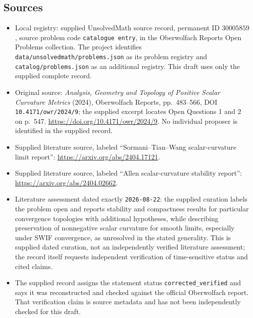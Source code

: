 \documentclass[11pt]{article}
\begin{document}
\subsection{Sources}
\begin{itemize}
\item Local registry: supplied UnsolvedMath source record, permanent ID \(30005859\), source problem code \texttt{catalogue entry}, in the Oberwolfach Reports Open Problems collection. The project identifies \texttt{data/unsolvedmath/problems.json} as its problem registry and \texttt{catalog/problems.json} as an additional registry. This draft uses only the supplied complete record.
\item Original source: \emph{Analysis, Geometry and Topology of Positive Scalar Curvature Metrics} (2024), Oberwolfach Reports, pp.\ 483--566, DOI \texttt{10.4171/owr/2024/9}; the supplied excerpt locates Open Questions 1 and 2 on p.\ 547. \url{https://doi.org/10.4171/owr/2024/9}. No individual proposer is identified in the supplied record.
\item Supplied literature source, labeled ``Sormani--Tian--Wang scalar-curvature limit report'': \url{https://arxiv.org/abs/2404.17121}.
\item Supplied literature source, labeled ``Allen scalar-curvature stability report'': \url{https://arxiv.org/abs/2404.02662}.
\item Literature assessment dated exactly \texttt{2026-08-22}: the supplied curation labels the problem open and reports stability and compactness results for particular convergence topologies with additional hypotheses, while describing preservation of nonnegative scalar curvature for smooth limits, especially under SWIF convergence, as unresolved in the stated generality. This is supplied dated curation, not an independently verified literature assessment; the record itself requests independent verification of time-sensitive status and cited claims.
\item The supplied record assigns the statement status \texttt{corrected\_verified} and says it was reconstructed and checked against the official Oberwolfach report. That verification claim is source metadata and has not been independently checked for this draft.
\end{itemize}
\end{document}
